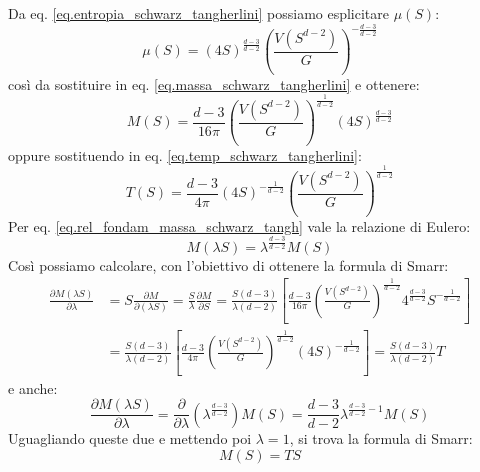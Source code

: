  Da eq. \ref{eq.entropia_schwarz_tangherlini} possiamo esplicitare $\mu(S)$:
\begin{equation*}
     \mu(S) = (4S)^{\frac{d-3}{d-2}}\left( \frac{V(S^{d-2})}{G}\right)^{- \frac{d-3}{d-2}}
 \end{equation*}
così da sostituire in eq. \ref{eq.massa_schwarz_tangherlini} e ottenere:
\begin{equation}
    M(S) = \frac{d-3}{16\pi}\left( \frac{V(S^{d-2})}{G}\right)^{\frac{1}{d-2}}(4S)^{\frac{d-3}{d-2}}
    \label{eq.rel_fondam_massa_schwarz_tangh}
\end{equation}
oppure sostituendo in eq. \ref{eq.temp_schwarz_tangherlini}:
\begin{equation}
    T(S)= \frac{d-3}{4\pi}(4S)^{-\frac{1}{d-2}} \left( \frac{V(S^{d-2})}{G}\right)^{\frac{1}{d-2}}
    \label{eq.rel_fondam_temper_schwarz_tangh}
\end{equation}
Per eq. \ref{eq.rel_fondam_massa_schwarz_tangh} vale la relazione di Eulero:
\begin{equation*}
    M(\lambda S) = \lambda^{\frac{d-3}{d-2}}M(S)
\end{equation*}
Così possiamo calcolare, con l'obiettivo di ottenere la formula di Smarr:
\begin{align*}
    \frac{\partial M(\lambda S)}{\partial \lambda} &= S \frac{\partial M}{\partial(\lambda S)}= \frac{S}{\lambda}\frac{\partial M}{\partial S} =\frac{S(d-3)}{\lambda(d-2)}\left[\frac{d-3}{16\pi}\left(\frac{V(S^{d-2})}{G}\right)^{\frac{1}{d-2}}4^{\frac{d-3}{d-2}}S^{- \frac{1}{d-2}}\right] \\
    &= \frac{S(d-3)}{\lambda(d-2)}\left[\frac{d-3}{4\pi}\left(\frac{V(S^{d-2})}{G}\right)^{\frac{1}{d-2}}(4S)^{- \frac{1}{d-2}}\right] = \frac{S(d-3)}{\lambda(d-2)} T
\end{align*}
e anche:
\begin{equation*}
    \frac{\partial M(\lambda S)}{\partial \lambda} = \frac{\partial}{\partial \lambda}\left( \lambda^{\frac{d-3}{d-2}}\right)M(S) = \frac{d-3}{d-2}\lambda^{\frac{d-3}{d-2}-1}M(S)
\end{equation*}
Uguagliando queste due e mettendo poi $\lambda = 1$, si trova la formula di Smarr:
\begin{equation*}
    M(S) = TS
\end{equation*}

